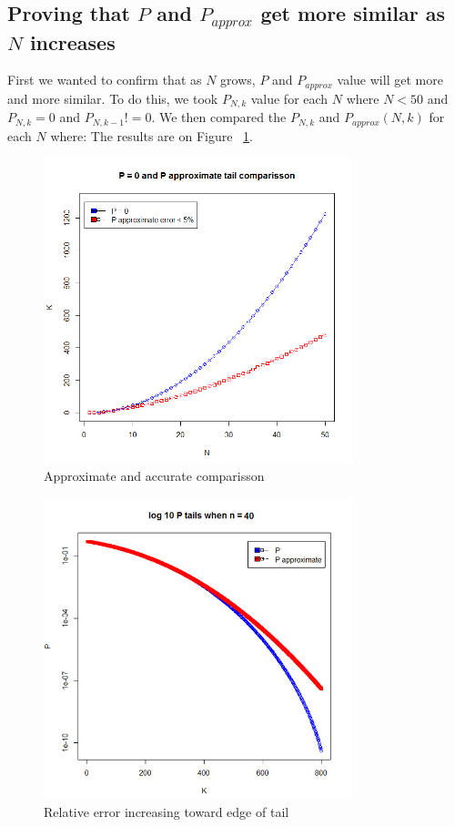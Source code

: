 \documentclass[12pt]{article}
\begin{document}
\subsection{Proving that $P$ and $P_{approx}$ get more similar as $N$ increases}
First we wanted to confirm that as $N$ grows, $P$ and $P_{approx}$ value will get more and more similar. To do this, we took $P_{N, k}$ value for each $N$ where
$N < 50$ and $P_{N, k}  = 0$ and $P_{N, k - 1} != 0$.
We then compared the $P_{N, k}$ and $P_{approx} (N, k)$ for each $N$ where:
The results are on Figure ~\ref{fig:T0vsN}.


\begin{figure}[!h]
	\centering
  \includegraphics[width=0.8\textwidth]{T0vsN}
	\caption{Approximate and accurate comparisson}
	\label{fig:T0vsN}
\end{figure}

\begin{figure}[!h]
	\centering
  \includegraphics[width=0.8\textwidth]{log10PtailsN40}
	\caption{Relative error increasing toward edge of tail}
	\label{fig:log10PtailsN40}
\end{figure}
\end{document}
